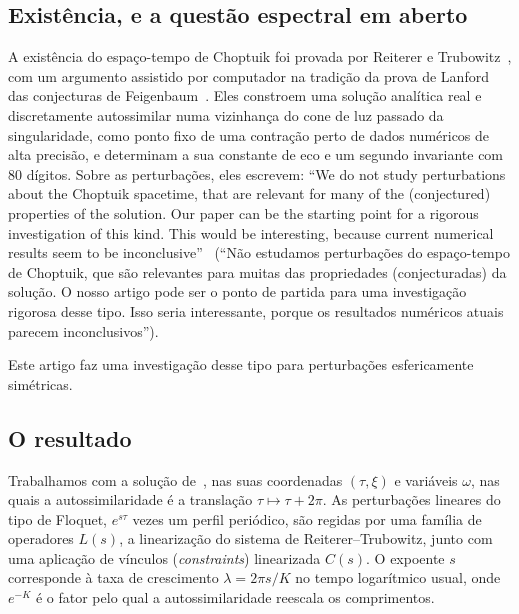 \subsection{Existência, e a questão espectral em aberto}

A existência do espaço-tempo de Choptuik foi provada por Reiterer e Trubowitz~\cite{RT2019}, com um argumento
assistido por computador na tradição da prova de Lanford das conjecturas de Feigenbaum~\cite{Lanford1982}. Eles constroem uma
solução analítica real e discretamente autossimilar numa vizinhança do cone de luz passado da singularidade, como
ponto fixo de uma contração perto de dados numéricos de alta precisão, e determinam a sua constante de eco e um
segundo invariante com $80$ dígitos. Sobre as perturbações, eles escrevem: ``We do not study perturbations about the
Choptuik spacetime, that are relevant for many of the (conjectured) properties of the solution. Our paper can be
the starting point for a rigorous investigation of this kind. This would be interesting, because current
numerical results seem to be inconclusive''~\cite[\S1]{RT2019} (``Não estudamos perturbações do espaço-tempo de
Choptuik, que são relevantes para muitas das propriedades (conjecturadas) da solução. O nosso artigo pode ser o ponto
de partida para uma investigação rigorosa desse tipo. Isso seria interessante, porque os resultados numéricos atuais
parecem inconclusivos'').

Este artigo faz uma investigação desse tipo para perturbações esfericamente simétricas.

\subsection{O resultado}

Trabalhamos com a solução de~\cite{RT2019}, nas suas coordenadas $(\tau,\xi)$ e variáveis $\omega$, nas quais a
autossimilaridade é a translação $\tau\mapsto\tau+2\pi$. As perturbações lineares do tipo de Floquet,
$e^{s\tau}$ vezes um perfil periódico, são regidas por uma família de operadores $L(s)$, a linearização do
sistema de Reiterer--Trubowitz, junto com uma aplicação de vínculos (\emph{constraints}) linearizada $C(s)$. O expoente $s$ corresponde à
taxa de crescimento $\lambda=2\pi s/K$ no tempo logarítmico usual, onde $e^{-K}$ é o fator pelo qual a
autossimilaridade reescala os comprimentos.

